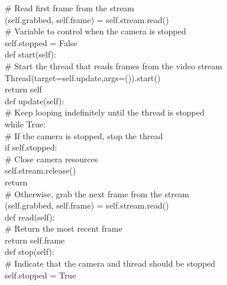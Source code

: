        \# Read first frame from the stream\\
        (self.grabbed, self.frame) = self.stream.read()\\

	\# Variable to control when the camera is stopped\\
        self.stopped = False\\

    def start(self):\\
	\# Start the thread that reads frames from the video stream\\
        Thread(target=self.update,args=()).start()\\
        return self\\

    def update(self):\\
        \# Keep looping indefinitely until the thread is stopped\\
        while True:\\
            \# If the camera is stopped, stop the thread\\
            if self.stopped:\\
                \# Close camera resources\\
                self.stream.release()\\
                return\\

            \# Otherwise, grab the next frame from the stream\\
            (self.grabbed, self.frame) = self.stream.read()\\

    def read(self):\\
	\# Return the most recent frame\\
        return self.frame\\

    def stop(self):\\
	\# Indicate that the camera and thread should be stopped\\
        self.stopped = True\\


